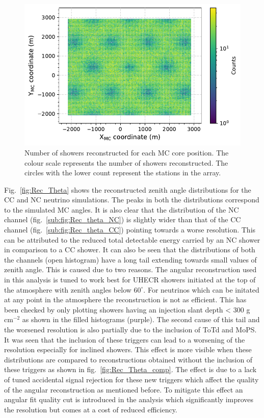 \begin{figure}[h!]
  \centering
  \includegraphics[width=14.5cm]{thesis_figures/Nu_analysis/MC_control/Core_position_Profile_MC_wnt_redcut.pdf}
  \caption{Number of showers reconstructed for each MC core position. The colour scale represents the number of showers reconstructed. The circles with the lower count represent the stations in the array.}
  \label{fig:Core_XY_rec}
\end{figure}
Fig.~\ref{fig:Rec_Theta} shows the reconstructed zenith angle distributions for the CC and NC neutrino simulations. The peaks in both the distributions correspond to the simulated MC angles. It is also clear that the distribution of the NC channel (fig.~\ref{sub:fig:Rec_theta_NC}) is slightly wider than that of the CC channel (fig.~\ref{sub:fig:Rec_theta_CC}) pointing towards a worse resolution. This can be attributed to the reduced total detectable energy carried by an NC shower in comparison to a CC shower. It can also be seen that the distributions of both the channels (open histogram) have a long tail extending towards small values of zenith angle. This is caused due to two reasons. The angular reconstruction used in this analysis is tuned to work best for UHECR showers initiated at the top of the atmosphere with zenith angles below $60^{\circ}$. For neutrinos which can be initated at any point in the atmosphere the reconstruction is not as efficient. This has been checked by only plotting showers having an injection slant depth < 300 g cm$^{-2}$ as shown in the filled histograms (purple). The second cause of this tail and the worsened resolution is also partially due to the inclusion of ToTd and MoPS. It was seen that the inclusion of these triggers can lead to a worsening of the resolution especially for inclined showers. This effect is more visible when these distributions are compared to reconstructions obtained without the inclusion of these triggers as shown in fig.~\ref{fig:Rec_Theta_comp}. The effect is due to a lack of tuned accidental signal rejection for these new triggers which affect the quality of the angular reconstruction as mentioned before. To mitigate this effect an angular fit quality cut is introduced in the analysis which significantly improves the resolution but comes at a cost of reduced efficiency.

